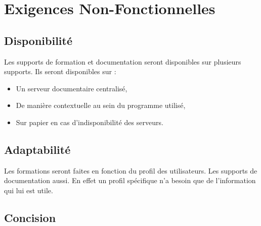 \section{Exigences Non-Fonctionnelles}

\subsection{Disponibilité}

Les supports de formation et documentation seront disponibles sur plusieurs supports.
Ils seront disponibles sur : 
\begin{itemize}
\item Un serveur documentaire centralisé,
\item De manière contextuelle au sein du programme utilisé,
\item Sur papier en cas d'indisponibilité des serveurs.
\end{itemize}

\subsection{Adaptabilité}

Les formations seront faites en fonction du profil des utilisateurs. 
Les supports de documentation aussi. En effet un profil spécifique n'a besoin
que de l'information qui lui est utile.

\subsection{Concision}


